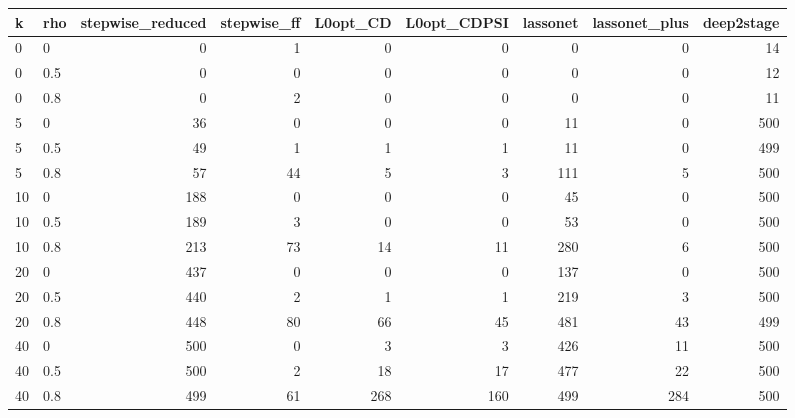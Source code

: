 \begin{tabular}{llrrrrrrr}
\toprule
k & rho & stepwise\_reduced & stepwise\_ff & L0opt\_CD & L0opt\_CDPSI & lassonet & lassonet\_plus & deep2stage \\
\midrule
0 & 0 & 0 & 1 & 0 & 0 & 0 & 0 & 14 \\
0 & 0.5 & 0 & 0 & 0 & 0 & 0 & 0 & 12 \\
0 & 0.8 & 0 & 2 & 0 & 0 & 0 & 0 & 11 \\
5 & 0 & 36 & 0 & 0 & 0 & 11 & 0 & 500 \\
5 & 0.5 & 49 & 1 & 1 & 1 & 11 & 0 & 499 \\
5 & 0.8 & 57 & 44 & 5 & 3 & 111 & 5 & 500 \\
10 & 0 & 188 & 0 & 0 & 0 & 45 & 0 & 500 \\
10 & 0.5 & 189 & 3 & 0 & 0 & 53 & 0 & 500 \\
10 & 0.8 & 213 & 73 & 14 & 11 & 280 & 6 & 500 \\
20 & 0 & 437 & 0 & 0 & 0 & 137 & 0 & 500 \\
20 & 0.5 & 440 & 2 & 1 & 1 & 219 & 3 & 500 \\
20 & 0.8 & 448 & 80 & 66 & 45 & 481 & 43 & 499 \\
40 & 0 & 500 & 0 & 3 & 3 & 426 & 11 & 500 \\
40 & 0.5 & 500 & 2 & 18 & 17 & 477 & 22 & 500 \\
40 & 0.8 & 499 & 61 & 268 & 160 & 499 & 284 & 500 \\
\bottomrule
\end{tabular}
